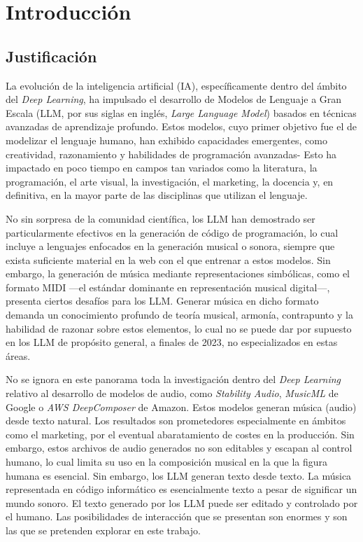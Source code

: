 \chapter{Introducción}

\section{Justificación}

La evolución de la inteligencia artificial (IA), específicamente dentro del ámbito del \textit{Deep Learning}, ha impulsado el desarrollo de Modelos de Lenguaje a Gran Escala (LLM, por sus siglas en inglés, \textit{Large Language Model}) basados en técnicas avanzadas de aprendizaje profundo. Estos modelos, cuyo primer objetivo fue el de modelizar el lenguaje humano, han exhibido capacidades emergentes, como creatividad, razonamiento y habilidades de programación avanzadas- Esto ha impactado en poco tiempo en campos tan variados como la literatura, la programación, el arte visual, la investigación, el marketing, la docencia y, en definitiva, en la mayor parte de las disciplinas que utilizan el lenguaje.

No sin sorpresa de la comunidad científica, los LLM han demostrado ser particularmente efectivos en la generación de código de programación, lo cual incluye a lenguajes enfocados en la generación musical o sonora, siempre que exista suficiente material en la web con el que entrenar a estos modelos. Sin embargo, la generación de música mediante representaciones simbólicas, como el formato MIDI —el estándar dominante en representación musical digital—, presenta ciertos desafíos para los LLM. Generar música en dicho formato demanda un conocimiento profundo de teoría musical, armonía, contrapunto y la habilidad de razonar sobre estos elementos, lo cual no se puede dar por supuesto en los LLM de propósito general, a finales de 2023, no especializados en estas áreas.

No se ignora en este panorama toda la investigación dentro del \textit{Deep Learning} relativo al desarrollo de modelos de audio, como \textit{Stability Audio}, \textit{MusicML} de Google o \textit{AWS DeepComposer} de Amazon. Estos modelos generan música (audio) desde texto natural. Los resultados son prometedores especialmente en ámbitos como el marketing, por el eventual abaratamiento de costes en la producción. Sin embargo, estos archivos de audio generados no son editables y escapan al control humano, lo cual limita su uso en la composición musical en la que la figura humana es esencial. Sin embargo, los LLM generan texto desde texto. La música representada en código informático es esencialmente texto a pesar de significar un mundo sonoro. El texto generado por los LLM puede ser editado y controlado por el humano. Las posibilidades de interacción que se presentan son enormes y son las que se pretenden explorar en este trabajo.

